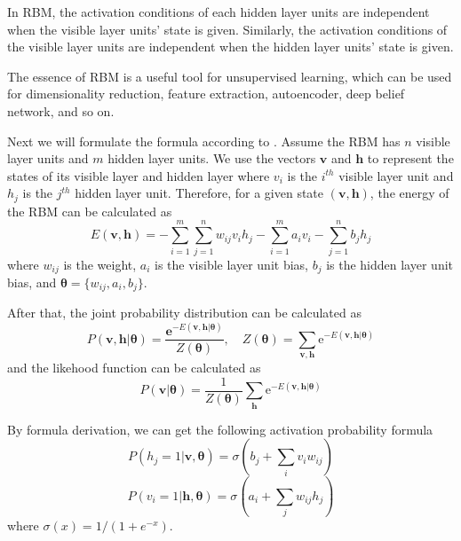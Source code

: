 \documentclass{bioinfo}
\begin{document}
In RBM, the activation conditions of each hidden layer units are independent when the visible layer units' state is given. Similarly, the activation conditions of the visible layer units are independent when the hidden layer units' state is given.

The essence of RBM is a useful tool for unsupervised learning, which can be used for dimensionality reduction, feature extraction, autoencoder, deep belief network, and so on.

Next we will formulate the formula according to \cite{zhangchunxia}. Assume the RBM has $n$ visible layer units and $m$ hidden layer units. We use the vectors $\mathbf{v}$ and $\mathbf{h}$ to represent the states of its visible layer and hidden layer where $v_i$ is the $i^{th}$ visible layer unit and $h_j$ is the $j^{th}$ hidden layer unit. Therefore, for a given state $(\mathbf{v}, \mathbf{h})$, the energy of the RBM can be calculated as
\begin{equation}
E(\mathbf{v}, \mathbf{h})=-\sum_{i=1}^{m} \sum_{j=1}^{n} w_{i j} v_{i} h_{j}-\sum_{i=1}^{m} a_{i} v_{i}-\sum_{j=1}^{n} b_{j} h_{j}
\end{equation}
where $w_{ij}$ is the weight, $a_{i}$ is the visible layer unit bias, $b_{j}$ is the hidden layer unit bias, and $\boldsymbol{\theta}=\{w_{ij}, a_i, b_j\}$.

After that, the joint probability distribution can be calculated as 
\begin{equation}
P(\mathbf{v}, \mathbf{h} | \boldsymbol{\theta})=\frac{\mathbf{e}^{-E(\mathbf{v}, \mathbf{h} | \boldsymbol{\theta})}}{Z(\boldsymbol{\theta})}, \quad Z(\boldsymbol{\theta})=\sum_{\mathbf{v}, \mathbf{h}} \mathrm{e}^{-E(\mathbf{v}, \mathbf{h} | \boldsymbol{\theta})}
\end{equation}
and the likehood function can be calculated as
\begin{equation}
P(\mathbf{v} | \boldsymbol{\theta})=\frac{1}{Z(\boldsymbol{\theta})} \sum_{\mathbf{h}} \mathrm{e}^{-E(\mathbf{v}, \mathbf{h} | \boldsymbol{\theta})}
\end{equation}

By formula derivation, we can get the following activation probability formula
\begin{equation}
P\left(h_{j}=1 | \mathbf{v}, \boldsymbol{\theta}\right)=\sigma\left(b_{j}+\sum_{i} v_{i} w_{i j}\right)
\end{equation}
\begin{equation}
P\left(v_{i}=1 | \mathbf{h}, \boldsymbol{\theta}\right)=\sigma\left(a_{i}+\sum_{j} w_{i j} h_{j}\right)
\end{equation}
where $\sigma(x)=1/(1+e^{-x})$.
\end{document}
